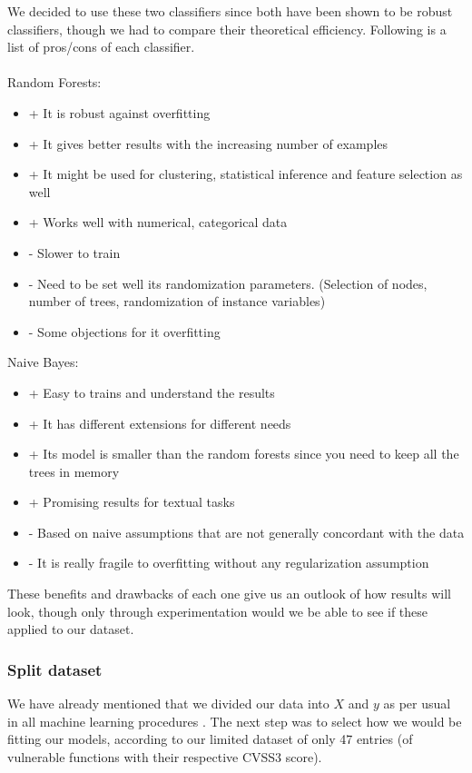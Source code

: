 We decided to use these two classifiers since both have been shown to be robust classifiers, though we had to compare their theoretical efficiency. Following is a list of pros/cons of each classifier.
\\\\
Random Forests:
\begin{itemize}
	\item + It is robust against overfitting
	\item + It gives better results with the increasing number of examples
	\item + It might be used for clustering, statistical inference and feature selection as well
	\item + Works well with numerical, categorical data
	\item - Slower to train
	\item - Need to be set well its randomization parameters. (Selection of nodes, number of trees, randomization of instance variables)
	\item - Some objections for it overfitting
\end{itemize}
Naive Bayes:
\begin{itemize}
	\item + Easy to trains and understand the results
	\item + It has different extensions for different needs
	\item + Its model is smaller than the random forests since you need to keep all the trees in memory
	\item + Promising results for textual tasks
	\item - Based on naive assumptions that are not generally concordant with the data
	\item - It is really fragile to overfitting without any regularization assumption
\end{itemize}

These benefits and drawbacks of each one give us an outlook of how results will look, though only through experimentation would we be able to see if these applied to our dataset.

\subsubsection{Split dataset}

We have already mentioned that we divided our data into $X$ and $y$ as per usual in all machine learning procedures \parencite{scikit}. The next step was to select how we would be fitting our models, according to our limited dataset of only 47 entries (of vulnerable functions with their respective CVSS3 score).

